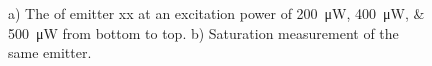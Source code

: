 	\begin{figure}[t]
		\begin{subfigure}[t]{ 0.49\linewidth}
			\centering
			\caption{}
		\label{fig::g2_powerdependent}
		\end{subfigure}
		\hfill
		\begin{subfigure}[t]{ 0.49\linewidth}
			\centering
			\caption{}
			\label{subfig::sat_Ir8}
		\end{subfigure}
		\caption{a) The \gtf of emitter xx at an excitation power of \SIlist{200;400;500}{\micro\watt} from bottom to top. b) Saturation measurement of the same emitter.}
		\label{fig::<fig>}
	\end{figure}

